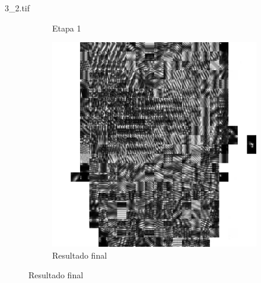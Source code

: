 \documentclass{beamer}
\begin{document}
\begin{frame}{3\_2.tif}
\begin{figure}
\begin{subfigure}[!ht]{0.32\textwidth}
                \caption{Etapa 1}
            \end{subfigure}
            \begin{subfigure}[!ht]{0.32\textwidth}
                \includegraphics[width=\columnwidth]{Fingerprints/3_2_final.jpg}
                \caption{Resultado final}
            \end{subfigure}
        \end{figure}
    \end{frame}
\end{document}
